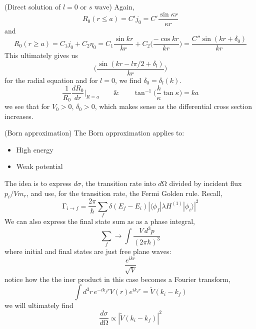 \vspace{2ex}
\begin{ex}
(Direct solution of $l=0$ or $s$ wave) Again,
\[R_0(r\leq a)=C'j_0=C'\dfrac{\sin \kappa r}{\kappa r}\]
and
\[R_0(r\geq a)=C_1j_0+C_2\eta_0=C_1\dfrac{\sin kr}{kr}+C_2\Big(\dfrac{-\cos kr}{kr}\Big)=\dfrac{C''\sin (kr+\delta_0)}{kr}\]
This ultimately gives us
\[\Big(\dfrac{\sin (kr-l\pi /2+\delta _{l})}{kr}\Big)\]
for the radial equation and for $l=0$, we find $\delta _0=\delta _{l}(k)$.
\[\dfrac{1}{R_0}\dfrac{d R_0}{d r}\Big|_{R=a}\qquad\&\qquad \tan ^{-1}\Big(\dfrac{k}{\kappa }\tan \kappa \Big)=ka\]
we see that for $V_0>0$, $\delta_0>0$, which makes sense as the differential cross section increases.
\end{ex}
\vspace{2ex}
\begin{thm}
(Born approximation) The Born approximation applies to:
\begin{itemize}
\item[(i)] High energy
\item[(ii)] Weak potential
\end{itemize}
The idea is to express $d\sigma $, the transition rate into $d\mathrm{\Omega} $ divided by incident flux $p_{i}/Vm_{r}$, and use, for the transition rate, the Fermi Golden rule. Recall,
\[\mathrm{\Gamma} _{i\rightarrow f}=\dfrac{2\pi }{\hbar }\sum _{f}\delta (E_{f}-E_{i})|\langle \phi _{f}|\lambda H^{(1)}|\phi _{i}\rangle |^2\]
We can also express the final state sum as as a phase integral,
\[\sum _{f}\rightarrow \int \dfrac{V\,d^3p}{(2\pi \hbar )^3}\]
where initial and final states are just free plane waves:
\[\dfrac{e^{ikr}}{\sqrt{V}}\]
notice how the the iner product in this case becomes a Fourier transform,
\[\int d^3r\,e^{-ik_{f}r}V(r)e^{ik_{i}r}=\tilde{V}(k_{i}-k_{f})\]
we will ultimately find
\[\dfrac{d\sigma }{d\mathrm{\Omega} } \propto |\tilde{V}(k_{i}-k_{f})|^2\]
\end{thm}
\vspace{2ex}

